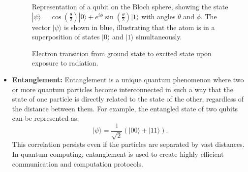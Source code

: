 \documentclass[12pt,a4paper]{report}
\begin{document}
\begin{itemize}
\begin{figure}[H]
        \caption{Representation of a qubit on the Bloch sphere, showing the state \( |\psi\rangle = \cos\left(\frac{\theta}{2}\right)|0\rangle + e^{i\phi}\sin\left(\frac{\theta}{2}\right)|1\rangle \) with angles \( \theta \) and \( \phi \). The vector \( |\psi\rangle \) is shown in blue, illustrating that the atom is in a superposition of states \( |0\rangle \) and \( |1\rangle \) simultaneously.}
        \end{figure}

    \begin{figure}[H]
        \centering
        \caption{Electron transition from ground state to excited state upon exposure to radiation.}
    \end{figure}

    \item \textbf{Entanglement:} 
    Entanglement is a unique quantum phenomenon where two or more quantum particles become interconnected in such a way that the state of one particle is directly related to the state of the other, regardless of the distance between them. For example, the entangled state of two qubits can be represented as:
    \[
    |\psi\rangle = \frac{1}{\sqrt{2}} \left( |00\rangle + |11\rangle \right).
    \]
    This correlation persists even if the particles are separated by vast distances. In quantum computing, entanglement is used to create highly efficient communication and computation protocols.


\end{itemize}
\end{document}
